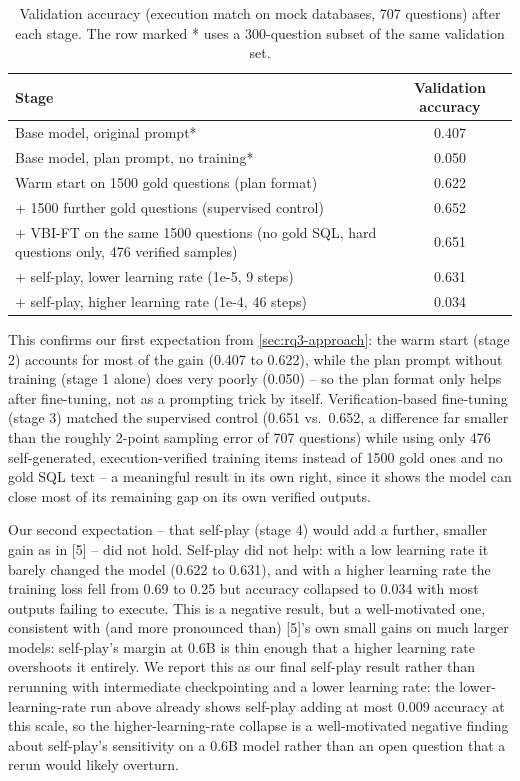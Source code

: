 \begin{table}[H]
\centering
\footnotesize
\caption{Validation accuracy (execution match on mock databases, 707 questions) after each stage. The row marked * uses a 300-question subset of the same validation set.}
\label{tab:rq3-validation-accuracy-06b}
\begin{tabular}{lc}
\toprule
Stage & Validation accuracy \\
\midrule
Base model, original prompt* & 0.407 \\
Base model, plan prompt, no training* & 0.050 \\
Warm start on 1500 gold questions (plan format) & 0.622 \\
+ 1500 further gold questions (supervised control) & 0.652 \\
+ VBI-FT on the same 1500 questions (no gold SQL, hard questions only, 476 verified samples) & 0.651 \\
+ self-play, lower learning rate (1e-5, 9 steps) & 0.631 \\
+ self-play, higher learning rate (1e-4, 46 steps) & 0.034 \\
\bottomrule
\end{tabular}
\end{table}

This confirms our first expectation from \ref{sec:rq3-approach}: the warm start (stage 2) accounts for most of the gain (0.407 to 0.622), while the plan prompt without training (stage 1 alone) does very poorly (0.050) -- so the plan format only helps after fine-tuning, not as a prompting trick by itself. Verification-based fine-tuning (stage 3) matched the supervised control (0.651 vs.\ 0.652, a difference far smaller than the roughly 2-point sampling error of 707 questions) while using only 476 self-generated, execution-verified training items instead of 1500 gold ones and no gold SQL text -- a meaningful result in its own right, since it shows the model can close most of its remaining gap on its own verified outputs.

Our second expectation -- that self-play (stage 4) would add a further, smaller gain as in [5] -- did not hold. Self-play did not help: with a low learning rate it barely changed the model (0.622 to 0.631), and with a higher learning rate the training loss fell from 0.69 to 0.25 but accuracy collapsed to 0.034 with most outputs failing to execute. This is a negative result, but a well-motivated one, consistent with (and more pronounced than) [5]'s own small gains on much larger models: self-play's margin at 0.6B is thin enough that a higher learning rate overshoots it entirely. We report this as our final self-play result rather than rerunning with intermediate checkpointing and a lower learning rate: the lower-learning-rate run above already shows self-play adding at most 0.009 accuracy at this scale, so the higher-learning-rate collapse is a well-motivated negative finding about self-play's sensitivity on a 0.6B model rather than an open question that a rerun would likely overturn.

